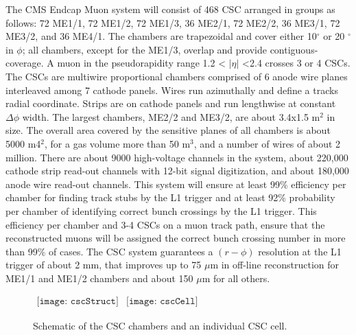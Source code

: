     The CMS Endcap Muon system will consist of 468 CSC arranged in groups as
      follows: 72 ME1/1, 72 ME1/2, 72 ME1/3, 36 ME2/1, 72 ME2/2, 36 ME3/1,
      72 ME3/2, and 36 ME4/1. 
    The chambers are trapezoidal and cover either 10$^{\circ}$ or 20 $^{\circ}$
      in $\phi$; all chambers, except for the ME1/3, overlap and provide 
      contiguous-coverage. 
    A muon in the pseudorapidity range 1.2 < $|\eta|$ <2.4 crosses 3 or 4 CSCs.
    The CSCs are multiwire proportional chambers comprised of 6 anode wire 
      planes interleaved among 7 cathode panels. 
    Wires run azimuthally and define a tracks radial coordinate. 
    Strips are on cathode panels and run lengthwise at constant $\Delta\phi$ 
      width. 
    The largest chambers, ME2/2 and ME3/2, are about 3.4x1.5 m$^{2}$ in size. 
    The overall area covered by the sensitive planes of all chambers is about 
      5000 m4$^{2}$, for a gas volume more than 50 m$^{3}$, and a number of 
      wires of about 2 million. 
    There are about 9000 high-voltage channels in the system, about 220,000 
      cathode strip read-out channels with 12-bit signal digitization, and 
      about 180,000 anode wire read-out channels. 
    This system will ensure at least 99\% efficiency per chamber for finding 
      track stubs by the L1 trigger and at least 92\% probability per chamber 
      of identifying correct bunch crossings by the L1 trigger. 
    This efficiency per chamber and 3-4 CSCs on a muon track path, ensure that 
      the reconstructed muons will be assigned the correct bunch crossing 
      number in more than 99\% of cases. 
    The CSC system guarantees a $(r-\phi)$ resolution at the L1 trigger of 
      about 2 mm, that improves up to 75 $\mu$m in off-line reconstruction for 
      ME1/1 and ME1/2 chambers and about 150 $\mu$m for all others.

    \begin{figure}[!Hhbt]
      \centering
      $ \begin{array}{cc}
        \texttt{[image: cscStruct]} &
        \texttt{[image: cscCell]}
      \end{array} $
      \caption{Schematic of the CSC chambers and an individual CSC cell.}
      \label{fig:cscSchem}
    \end{figure}

